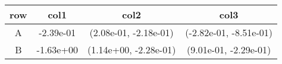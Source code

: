 \begin{tabular}{cccc}
\toprule
row&col1&col2&col3\tabularnewline
\midrule
A&-2.39e-01& (2.08e-01, -2.18e-01)& (-2.82e-01, -8.51e-01)\tabularnewline
B&-1.63e+00& (1.14e+00, -2.28e-01)& (9.01e-01, -2.29e-01)\tabularnewline
\bottomrule
\end{tabular}
